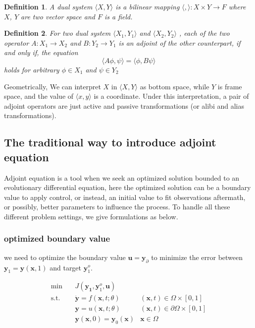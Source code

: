 \documentclass{article}
\newtheorem{definition}{Definition}
\begin{document}
\begin{definition}
\label{d0}
A dual system $ \langle X, Y \rangle $ is a bilinear mapping $ \langle , \rangle : X \times Y \to F $ where $X$, $Y$ are two vector space and $ F $ is a field.
\end{definition}

\begin{definition}
\label{d1}
For two dual system $ \langle X_1, Y_1 \rangle $ and $ \langle X_2, Y_2 \rangle $ , each of the two operator $ A : X_1 \to X_2$ and $ B : Y_2 \to Y_1 $ is an adjoint of the other counterpart,
if and only if, the equation $$ \langle A \phi, \psi \rangle = \langle \phi, B \psi \rangle $$ holds for arbitrary $ \phi \in X_1 $ and $ \psi \in Y_2 $
\end{definition}

Geometrically, We can interpret $ X $ in $ \langle X, Y \rangle $ as bottom space, while $ Y $ is frame space, and the value of $ \langle x, y \rangle $ is a coordinate.
Under this interpretation, a pair of adjoint operators are just active and passive transformations (or alibi and alias transformations)\cite{wiki:aptrans}.

\subsection{The traditional way to introduce adjoint equation}

Adjoint equation is a tool when we seek an optimized solution bounded to an evolutionary differential equation, here the optimized solution can be a boundary value to apply control, or instead, an initial value to fit observations aftermath, or possibly, better parameters to influence the process.
To handle all these different problem settings, we give formulations as below.

\subsubsection{optimized boundary value}

we need to optimize the boundary value $ \mathbf{u} = \mathbf{y}_{\partial} $ to minimize the error between $ \mathbf{y}_1 = \mathbf{y}(\mathbf{x}, 1)$ and target $ \mathbf{y}_1^o $.

$$
\begin{array}{rcll}
\min &~& J(\mathbf{y_1}, \mathbf{y}_1^o, \mathbf{u}) & \\
\mathrm{s.t.} &~& \dot{\mathbf{y}} = f(\mathbf{x}, t; \theta) & (\mathbf{x}, t) \in \Omega \times [0, 1] \\
&~& \mathbf{y} = u(\mathbf{x}, t; \theta) & (\mathbf{x}, t) \in \partial \Omega \times [0, 1] \\
&~& \mathbf{y}(\mathbf{x}, 0) = \mathbf{y}_0(\mathbf{x}) & \mathbf{x} \in \Omega
\end{array}
$$
\end{document}
